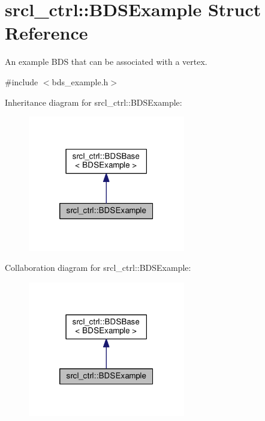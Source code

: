 \hypertarget{structsrcl__ctrl_1_1BDSExample}{\section{srcl\-\_\-ctrl\-:\-:B\-D\-S\-Example Struct Reference}
\label{structsrcl__ctrl_1_1BDSExample}
}


An example B\-D\-S that can be associated with a vertex.  




{\ttfamily \#include $<$bds\-\_\-example.\-h$>$}



Inheritance diagram for srcl\-\_\-ctrl\-:\-:B\-D\-S\-Example\-:\nopagebreak
\begin{figure}[H]
\begin{center}
\leavevmode
\includegraphics[width=194pt]{structsrcl__ctrl_1_1BDSExample__inherit__graph}
\end{center}
\end{figure}


Collaboration diagram for srcl\-\_\-ctrl\-:\-:B\-D\-S\-Example\-:\nopagebreak
\begin{figure}[H]
\begin{center}
\leavevmode
\includegraphics[width=194pt]{structsrcl__ctrl_1_1BDSExample__coll__graph}
\end{center}
\end{figure}

